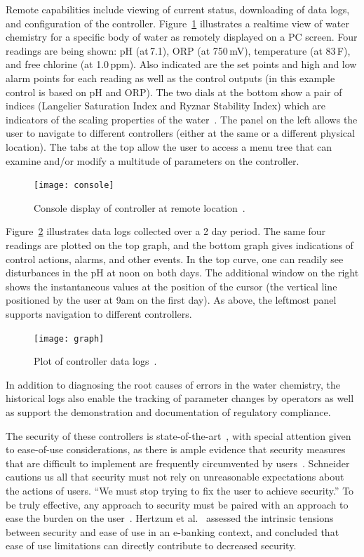 Remote capabilities include viewing of current status, downloading
of data logs, and configuration of the controller.
Figure~\ref{console} illustrates a realtime view of water chemistry
for a specific body of water
as remotely displayed on a PC screen.  Four readings are being shown:
pH (at\,7.1), ORP (at 750\,mV), temperature (at 83\,\degree F), and
free chlorine (at 1.0\,ppm).  Also indicated are the set points and
high and low alarm points for each reading as well as the control
outputs (in this example control is based on pH and ORP).
The two dials at the bottom show a pair of indices
(Langelier Saturation Index and Ryznar Stability Index)
which are indicators of the scaling properties of the water~\cite{mb88}.
The panel on the left allows the user to navigate to different
controllers (either at the same or a different physical location).
The tabs at the top allow the user to access a menu tree that
can examine and/or modify a multitude of parameters on the controller.

\begin{figure}[ht]
 \center
\texttt{[image: console]}
    \caption{Console display of controller at remote location~\protect\cite{ccgss18}.}
    \label{console}
\end{figure}

Figure~\ref{graph} illustrates data logs collected over a 2 day period.
The same four readings are plotted on the top graph, and the bottom
graph gives indications of control actions, alarms, and other events.
In the top curve, one can readily see disturbances in the pH at noon
on both days.
The additional window on the right shows the instantaneous values
at the position of the cursor (the vertical line positioned
by the user at 9am on the first day).
As above, the leftmost panel supports navigation to different
controllers.

\begin{figure}[ht]
 \center
\texttt{[image: graph]}
    \caption{Plot of controller data logs~\protect\cite{ccgss18}.}
    \label{graph}
\end{figure}

In addition to diagnosing the root causes of errors in the water
chemistry, the historical logs also enable the tracking of
parameter changes by operators as well as support the demonstration
and documentation of regulatory compliance.

The security of these controllers is
state-of-the-art~\cite{ezconnect,ccgss18}, with special attention given
to ease-of-use considerations, as there is ample evidence that
security measures that are difficult to implement are frequently
circumvented by users~\cite{gefen2000,hertzum2004,schneier16}.
Schneider~\cite{schneier16} cautions us all that security must
not rely on unreasonable expectations about the actions of users.
``We must stop trying to fix the user to achieve security.''
To be truly effective, any approach to security must be paired
with an approach to ease the burden on the user~\cite{gefen2000}.
Hertzum et al.~\cite{hertzum2004} assessed the intrinsic tensions between
security and ease of use in an e-banking context, and concluded
that ease of use limitations can directly contribute to decreased
security.

